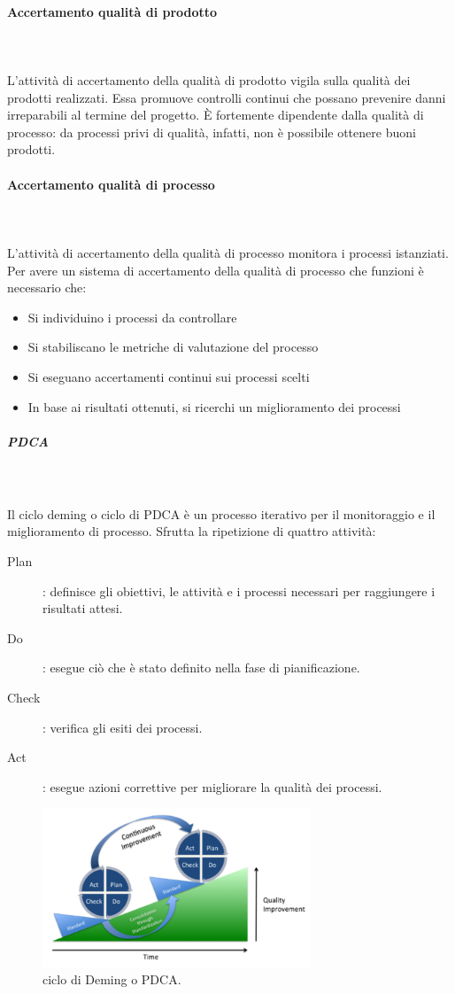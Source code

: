 \documentclass[../norme-di-progetto.tex]{subfiles}
\begin{document}
\paragraph{Accertamento qualità di prodotto}\mbox{}\\
\label{par:accertamento qualita di prodotto}
\\L'attività di accertamento della qualità di prodotto vigila sulla qualità dei prodotti realizzati. Essa promuove controlli continui che possano prevenire danni irreparabili al termine del progetto. È fortemente dipendente dalla qualità di processo: da processi privi di qualità, infatti, non è possibile ottenere buoni prodotti.  
\paragraph{Accertamento qualità di processo}\mbox{}\\
\label{par:accertamento qualita di processo}
\\L'attività di accertamento della qualità di processo monitora i processi istanziati. Per avere un sistema di accertamento della qualità di processo che funzioni è necessario che:
\begin{itemize}
	\item Si individuino i processi da controllare
	\item Si stabiliscano le metriche di valutazione del processo
	\item Si eseguano accertamenti continui sui processi scelti
	\item In base ai risultati ottenuti, si ricerchi un miglioramento dei processi
\end{itemize} 
\subparagraph{PDCA}\mbox{}\\
\label{subp:PDCA}
\\Il ciclo deming o ciclo di PDCA è un processo iterativo per il monitoraggio e il miglioramento di processo. Sfrutta la ripetizione di quattro attività:
\begin{description}
	\item [Plan]: definisce gli obiettivi, le attività e i processi necessari per raggiungere i risultati attesi.
	\item [Do]: esegue ciò che è stato definito nella fase di pianificazione.
	\item [Check]: verifica gli esiti dei processi.
	\item [Act]: esegue azioni correttive per migliorare la qualità dei processi.
\end{description}
\begin{figure}[H]
\includegraphics[width=8cm]{components/PDCA-process.png}
\centering
\caption{ciclo di Deming o PDCA.}
\end{figure}
\end{document}
